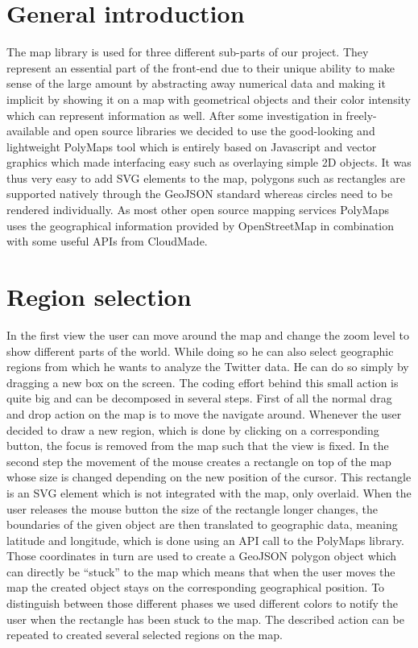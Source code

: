 \section{General introduction}

The map library is used for three different sub-parts of our project. They represent an essential part of the front-end due to their unique ability to make sense of the large amount by abstracting away numerical data and making it implicit by showing it on a map with geometrical objects and their color intensity which can represent information as well.
After some investigation in freely-available and open source libraries we decided to use the good-looking and lightweight PolyMaps tool which is entirely based on Javascript and vector graphics which made interfacing easy such as overlaying simple 2D objects. It was thus very easy to add SVG elements to the map, polygons such as rectangles are supported natively through the GeoJSON standard whereas circles need to be rendered individually. As most other open source mapping services PolyMaps uses the geographical information provided by OpenStreetMap in combination with some useful APIs from CloudMade. 

\section{Region selection}
In the first view the user can move around the map and change the zoom level to show different parts of the world. While doing so he can also select geographic regions from which he wants to analyze the Twitter data. He can do so simply by dragging a new box on the screen. The coding effort behind this small action is quite big and can be decomposed in several steps. First of all the normal drag and drop action on the map is to move the navigate around. Whenever the user decided to draw a new region, which is done by clicking on a corresponding button, the focus is removed from the map such that the view is fixed. In the second step the movement of the mouse creates a rectangle on top of the map whose size is changed depending on the new position of the cursor. This rectangle is an SVG element which is not integrated with the map, only overlaid. When the user releases the mouse button the size of the rectangle longer changes, the boundaries of the given object are then translated to geographic data, meaning latitude and longitude, which is done using an API call to the PolyMaps library. Those coordinates in turn are used to create a GeoJSON polygon object which can directly be ``stuck'' to the map which means that when the user moves the map the created object stays on the corresponding geographical position. To distinguish between those different phases we used different colors to notify the user when the rectangle has been stuck to the map. The described action can be repeated to created several selected regions on the map.

